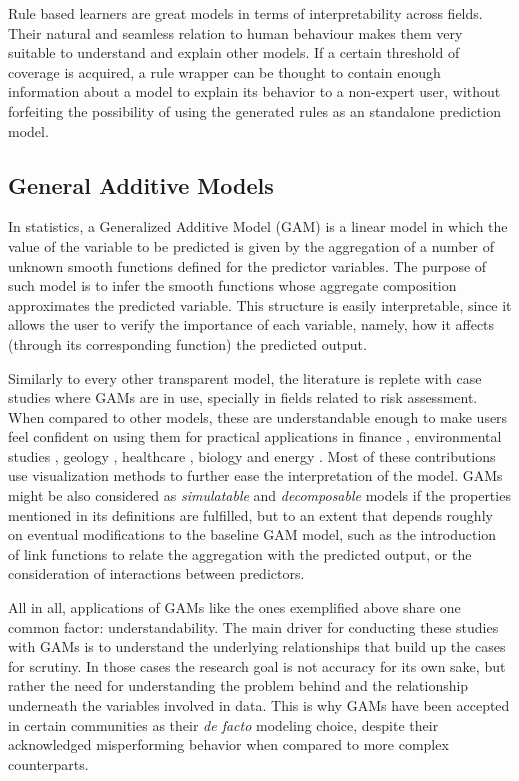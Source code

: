 \documentclass[final]{elsarticle}
\begin{document}
Rule based learners are great models in terms of interpretability across fields. Their natural and seamless relation to human behaviour makes them very suitable to understand and explain other models. If a certain threshold of coverage is acquired, a rule wrapper can be thought to contain enough information about a model to explain its behavior to a non-expert user, without forfeiting the possibility of using the generated rules as an standalone prediction model. 

\subsection{General Additive Models}

In statistics, a Generalized Additive Model (GAM) is a linear model in which the value of the variable to be predicted is given by the aggregation of a number of unknown smooth functions defined for the predictor variables. The purpose of such model is to infer the smooth functions whose aggregate composition approximates the predicted variable. This structure is easily interpretable, since it allows the user to verify the importance of each variable, namely, how it affects (through its corresponding function) the predicted output. 

Similarly to every other transparent model, the literature is replete with case studies where GAMs are in use, specially in fields related to risk assessment. When compared to other models, these are understandable enough to make users feel confident on using them for practical applications in finance \cite{Bankruptcy,BankLoanLoss,FianceScienceTechnology}, environmental studies \cite{RelationshipsEnviromental}, geology \cite{GeositeAssesment}, healthcare \cite{caruana2015Transferability}, biology \cite{SpeciesDistribution,ButterflyTranscent} and energy \cite{ElectricityLoad}. Most of these contributions use visualization methods to further ease the interpretation of the model. GAMs might be also considered as \textit{simulatable} and \textit{decomposable} models if the properties mentioned in its definitions are fulfilled, but to an extent that depends roughly on eventual modifications to the baseline GAM model, such as the introduction of link functions to relate the aggregation with the predicted output, or the consideration of interactions between predictors.

All in all, applications of GAMs like the ones exemplified above share one common factor: understandability. The main driver for conducting these studies with GAMs is to understand the underlying relationships that build up the cases for scrutiny. In those cases the research goal is not accuracy for its own sake, but rather the need for understanding the problem behind and the relationship underneath the variables involved in data. This is why GAMs have been accepted in certain communities as their \emph{de facto} modeling choice, despite their acknowledged misperforming behavior when compared to more complex counterparts.
\end{document}
